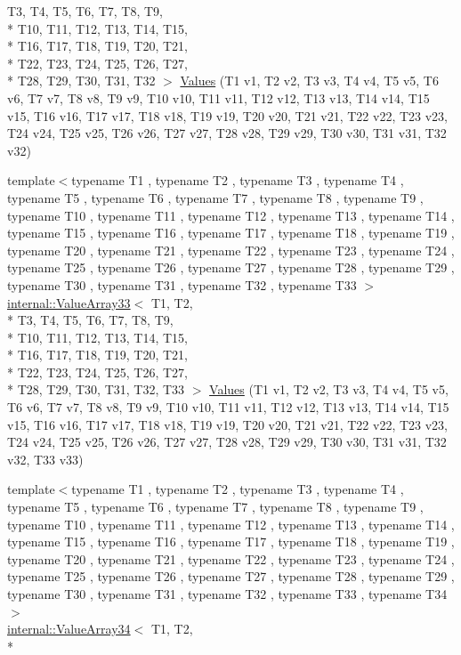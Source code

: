 \begin{DoxyCompactItemize}
T3, T4, T5, T6, T7, T8, T9, \\*
T10, T11, T12, T13, T14, T15, \\*
T16, T17, T18, T19, T20, T21, \\*
T22, T23, T24, T25, T26, T27, \\*
T28, T29, T30, T31, T32 $>$ \hyperlink{namespacetesting_afeff614d4c808c753bbfa208409ad664}{Values} (T1 v1, T2 v2, T3 v3, T4 v4, T5 v5, T6 v6, T7 v7, T8 v8, T9 v9, T10 v10, T11 v11, T12 v12, T13 v13, T14 v14, T15 v15, T16 v16, T17 v17, T18 v18, T19 v19, T20 v20, T21 v21, T22 v22, T23 v23, T24 v24, T25 v25, T26 v26, T27 v27, T28 v28, T29 v29, T30 v30, T31 v31, T32 v32)
\item 
{\footnotesize template$<$typename T1 , typename T2 , typename T3 , typename T4 , typename T5 , typename T6 , typename T7 , typename T8 , typename T9 , typename T10 , typename T11 , typename T12 , typename T13 , typename T14 , typename T15 , typename T16 , typename T17 , typename T18 , typename T19 , typename T20 , typename T21 , typename T22 , typename T23 , typename T24 , typename T25 , typename T26 , typename T27 , typename T28 , typename T29 , typename T30 , typename T31 , typename T32 , typename T33 $>$ }\\\hyperlink{classtesting_1_1internal_1_1ValueArray33}{internal\-::\-Value\-Array33}$<$ T1, T2, \\*
T3, T4, T5, T6, T7, T8, T9, \\*
T10, T11, T12, T13, T14, T15, \\*
T16, T17, T18, T19, T20, T21, \\*
T22, T23, T24, T25, T26, T27, \\*
T28, T29, T30, T31, T32, T33 $>$ \hyperlink{namespacetesting_ac972228f2ff86974ab6591a10512326a}{Values} (T1 v1, T2 v2, T3 v3, T4 v4, T5 v5, T6 v6, T7 v7, T8 v8, T9 v9, T10 v10, T11 v11, T12 v12, T13 v13, T14 v14, T15 v15, T16 v16, T17 v17, T18 v18, T19 v19, T20 v20, T21 v21, T22 v22, T23 v23, T24 v24, T25 v25, T26 v26, T27 v27, T28 v28, T29 v29, T30 v30, T31 v31, T32 v32, T33 v33)
\item 
{\footnotesize template$<$typename T1 , typename T2 , typename T3 , typename T4 , typename T5 , typename T6 , typename T7 , typename T8 , typename T9 , typename T10 , typename T11 , typename T12 , typename T13 , typename T14 , typename T15 , typename T16 , typename T17 , typename T18 , typename T19 , typename T20 , typename T21 , typename T22 , typename T23 , typename T24 , typename T25 , typename T26 , typename T27 , typename T28 , typename T29 , typename T30 , typename T31 , typename T32 , typename T33 , typename T34 $>$ }\\\hyperlink{classtesting_1_1internal_1_1ValueArray34}{internal\-::\-Value\-Array34}$<$ T1, T2, \\*

\end{DoxyCompactItemize}
